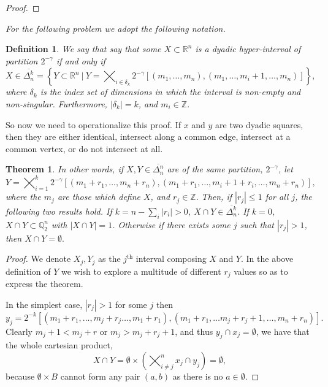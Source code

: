 \documentclass[letter]{article}
\newtheorem{theorem}{Theorem}
\newtheorem{definition}{Definition}
\newenvironment{menumerate}{%
  \edef\backupindent{\the\parindent}%
  \enumerate%
  \setlength{\parindent}{\backupindent}%
}{\endenumerate}
\begin{document}
\begin{menumerate}
\begin{menumerate}
\begin{proof}
 				\end{proof}

 			\item \textit{For the following problem we adopt the following notation.}
 				\begin{definition}
 				 We say that say that some $X \subset \mathbb{R}^n$ is a dyadic hyper-interval of partition $2^{-\gamma}$ if and only if 
 				 $$X \in \overline{\Delta_n^k} = \left\{ Y \subset \mathbb{R}^n\ |\ Y = \bigtimes_{i\in\delta_k}2^{-\gamma}\left[(m_1,\dots,m_n),(m_1 , \dots,m_i +1,\dots, m_n)\right]\right\}, $$
 				 where $\delta_k$ is the index set of dimensions in which the interval is non-empty and non-singular. Furthermore, $|\delta_k| = k$, and $m_i \in \mathbb{Z}.$
 				\end{definition}
 					So now we need to operationalize this proof. If $x$ and $y$ are two dyadic squares, then they are either identical, intersect along a common edge, intersect at a common vertex, or do not intersect at all.
				\begin{theorem}
					  In other words, if $X,Y \in \overline{\Delta_n^n}$ are of the same partition, $2^{-\gamma}$, let
					   $$Y = \bigtimes_{i=1}^k2^{-\gamma}\left[(m_1 + r_1,\dots,m_n + r_n),(m_1 + r_1, \dots,m_i +1 + r_i,\dots, m_n + r_n)\right],$$ 
					   where the $m_j$ are those which define $X$, and $r_j \in \mathbb{Z}.$ Then, if $|r_j| \leq 1$ for all $j$, the following two results hold. If $k = n - \sum_i|r_i| > 0$,  $X \cap Y \in \overline{\Delta_n^k}$. If $k = 0$, $X \cap Y \subset \mathbb{Q}_2^n$ with $|X\cap Y| = 1$. Otherwise if there exists some $j$ such that $|r_j| > 1$, then $X \cap Y = \emptyset.$

				\end{theorem}
				\begin{proof}
					We denote $X_j, Y_j$ as the $j^\mathrm{th}$ interval composing $X$ and $Y$. In the above definition of $Y$ we wish to explore a multitude of different $r_j$ values so as to express the theorem.

					In the simplest case, $|r_j| > 1$ for some $j$ then $$y_j = 2^{-k}[(m_1 + r_1,\dots,m_j + r_j\dots,m_1+r_1),(m_1+r_1,\dots m_j+r_j+1,\dots,m_n+r_n)].$$ Clearly $m_j + 1 < m_j + r$ or $m_j  > m_j +r_j + 1$, and thus $y_j \cap x_j = \emptyset$, we have that the whole cartesian product, 
						$$X\cap Y = \emptyset \times \left(\bigtimes_{i\neq j}^n x_j\cap y_j\right) = \emptyset,$$ 
						because $\emptyset \times B$ cannot form any pair $(a,b)$ as there is no $a\in\emptyset.$


\end{proof}
\end{menumerate}
\end{menumerate}
\end{document}
